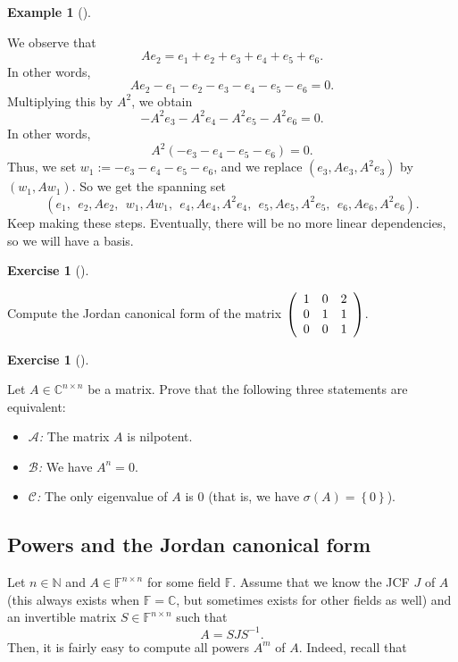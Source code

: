 \documentclass[numbers=enddot,12pt,final,onecolumn,notitlepage]{scrartcl}%
\newcounter{exer}
\numberwithin{exer}{subsection}
\theoremstyle{definition}
\newtheorem{exam}[theo]{Example}
\newenvironment{example}[1][]
{\begin{exam}[#1]\begin{leftbar}}
{\end{leftbar}\end{exam}}
\newtheorem{exmp}[exer]{Exercise}
\newenvironment{exercise}[1][]
{\begin{exmp}[#1]\begin{leftbar}}
{\end{leftbar}\end{exmp}}
\begin{document}
\begin{example}
We observe that%
\[
Ae_{2}=e_{1}+e_{2}+e_{3}+e_{4}+e_{5}+e_{6}.
\]
In other words,%
\[
Ae_{2}-e_{1}-e_{2}-e_{3}-e_{4}-e_{5}-e_{6}=0.
\]
Multiplying this by $A^{2}$, we obtain%
\[
-A^{2}e_{3}-A^{2}e_{4}-A^{2}e_{5}-A^{2}e_{6}=0.
\]
In other words,%
\[
A^{2}\left(  -e_{3}-e_{4}-e_{5}-e_{6}\right)  =0.
\]
Thus, we set $w_{1}:=-e_{3}-e_{4}-e_{5}-e_{6}$, and we replace $\left(
e_{3},Ae_{3},A^{2}e_{3}\right)  $ by $\left(  w_{1},Aw_{1}\right)  $. So we
get the spanning set
\[
\left(  e_{1},\ \ e_{2},Ae_{2},\ \ w_{1},Aw_{1},\ \ e_{4},Ae_{4},A^{2}%
e_{4},\ \ e_{5},Ae_{5},A^{2}e_{5},\ \ e_{6},Ae_{6},A^{2}e_{6}\right)  .
\]
Keep making these steps. Eventually, there will be no more linear
dependencies, so we will have a basis.
\end{example}

\begin{exercise}
 Compute the Jordan canonical form of the matrix $\left(
\begin{array}
[c]{ccc}%
1 & 0 & 2\\
0 & 1 & 1\\
0 & 0 & 1
\end{array}
\right)  $.
\end{exercise}

\begin{exercise}
\label{exe.jnf.step3.An=0} Let $A\in\mathbb{C}^{n\times n}$ be a
matrix. Prove that the following three statements are equivalent:

\begin{itemize}
\item $\mathcal{A}$\textit{:} The matrix $A$ is nilpotent.

\item $\mathcal{B}$\textit{:} We have $A^{n}=0$.

\item $\mathcal{C}$\textit{:} The only eigenvalue of $A$ is $0$ (that is, we
have $\sigma\left(  A\right)  =\left\{  0\right\}  $).
\end{itemize}
\end{exercise}

\subsection{Powers and the Jordan canonical form}

Let $n\in\mathbb{N}$ and $A\in\mathbb{F}^{n\times n}$ for some field
$\mathbb{F}$. Assume that we know the JCF $J$ of $A$ (this always exists when
$\mathbb{F}=\mathbb{C}$, but sometimes exists for other fields as well) and an
invertible matrix $S\in\mathbb{F}^{n\times n}$ such that
\[
A=SJS^{-1}.
\]
Then, it is fairly easy to compute all powers $A^{m}$ of $A$. Indeed, recall that
\end{document}
